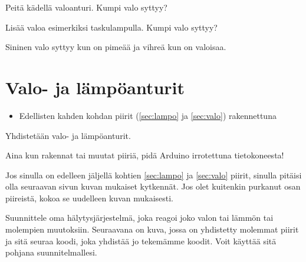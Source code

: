 \begin{tcolorbox}[colback=yellow!10, title={Tutki!},colbacktitle=orange]
Peitä kädellä valoanturi. Kumpi valo syttyy?

Lisää valoa esimerkiksi taskulampulla. Kumpi valo syttyy?

\begin{solution}
Sininen valo syttyy kun on pimeää ja vihreä kun on valoisaa.
\end{solution}
\end{tcolorbox}

\section{Valo- ja lämpöanturit}
\begin{minipage}{0.5\textwidth}
\begin{tcolorbox}[colback=lime!10,title=Tarvikkeet, colbacktitle=green!10,coltitle=black]
\begin{itemize}
    \item Edellisten kahden kohdan piirit (\ref{sec:lampo} ja \ref{sec:valo}) rakennettuna
\end{itemize}
\end{tcolorbox}
\end{minipage}
\begin{minipage}{0.5\textwidth}
\begin{tcolorbox}[colback=blue!10,title=Piirin toiminta,colbacktitle=purple!90]
Yhdistetään valo- ja lämpöanturit.
\end{tcolorbox}
\end{minipage}

\begin{tcolorbox}[colback=red!10,colbacktitle=red,title=HUOM!]
Aina kun rakennat tai muutat piiriä, pidä Arduino irrotettuna tietokoneesta! 
\end{tcolorbox}

Jos sinulla on edelleen jäljellä kohtien \ref{sec:lampo} ja \ref{sec:valo} piirit, sinulla pitäisi olla seuraavan sivun kuvan mukaiset kytkennät. Jos olet kuitenkin purkanut osan piireistä, kokoa se uudelleen kuvan mukaisesti.

\begin{tcolorbox}[title=Haaste!,colback=teal!10,colbacktitle=teal!90]
Suunnittele oma hälytysjärjestelmä, joka reagoi joko valon tai lämmön tai molempien muutoksiin.
\tcblower
Seuraavana on kuva, jossa on yhdistetty molemmat piirit ja sitä seuraa koodi, joka yhdistää jo tekemämme koodit. Voit käyttää sitä pohjana suunnitelmallesi.

\end{tcolorbox}

